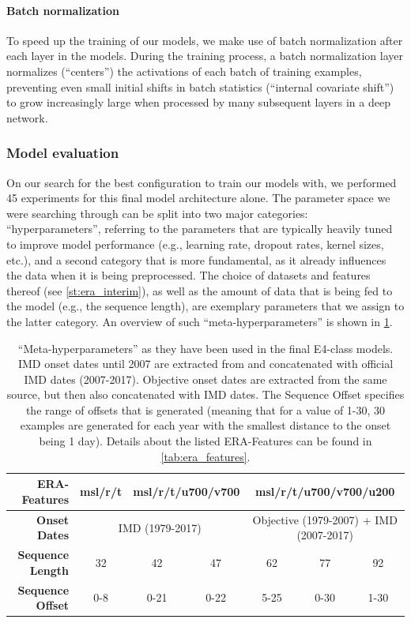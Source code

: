 \paragraph{Batch normalization} To speed up the training of our models, we make use of batch normalization after each layer in the models. During the training process, a batch normalization layer normalizes (``centers'') the activations of each batch of training examples, preventing even small initial shifts in batch statistics (``internal covariate shift'') to grow increasingly large when processed by many subsequent layers in a deep network.

\subsubsection{Model evaluation}
On our search for the best configuration to train our models with, we performed 45 experiments for this final model architecture alone. The parameter space we were searching through can be split into two major categories: ``hyperparameters'', referring to the parameters that are typically heavily tuned to improve model performance (e.g., learning rate, dropout rates, kernel sizes, etc.), and a second category that is more fundamental, as it already influences the data when it is being preprocessed. The choice of datasets and features thereof (see \cref{st:era_interim}), as well as the amount of data that is being fed to the model (e.g., the sequence length), are exemplary parameters that we assign to the latter category. An overview of such ``meta-hyperparameters'' is shown in \cref{tab:meta_parameters}.

\begin{table}[h!]
  \centering
  \begin{tabular}{|r|c|c|c|c|c|c|}
    \hline
    \textbf{ERA-Features} & \multicolumn{1}{c|}{msl/r/t} & \multicolumn{2}{c|}{msl/r/t/u700/v700} & \multicolumn{3}{c|}{msl/r/t/u700/v700/u200} \\
    \hline
    \textbf{Onset Dates} & \multicolumn{3}{c|}{IMD (1979-2017)} & \multicolumn{3}{c|}{Objective (1979-2007) + IMD (2007-2017)} \\
    \hline
    \textbf{Sequence Length} & 32 & 42 & 47 & 62 & 77 & 92 \\
    \hline
    \textbf{Sequence Offset} & 0-8 & 0-21 & 0-22 & 5-25 & 0-30 & 1-30 \\
    \hline
  \end{tabular}
  \caption{``Meta-hyperparameters'' as they have been used in the final E4-class models. IMD onset dates until 2007 are extracted from \citet{Singh.2009} and concatenated with official IMD dates (2007-2017). Objective onset dates are extracted from the same source, but then also concatenated with IMD dates. The Sequence Offset specifies the range of offsets that is generated (meaning that for a value of 1-30, 30 examples are generated for each year with the smallest distance to the onset being 1 day). Details about the listed ERA-Features can be found in \cref{tab:era_features}. }
  \label{tab:meta_parameters}
\end{table}

